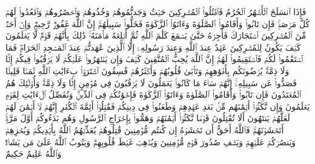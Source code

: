 \startbuffer[\q:9:5]
فَإِذَا ٱنسَلَخَ ٱلۡأَشۡهُرُ ٱلۡحُرُمُ فَٱقۡتُلُوا۟ ٱلۡمُشۡرِكِینَ حَیۡثُ وَجَدتُّمُوهُمۡ وَخُذُوهُمۡ وَٱحۡصُرُوهُمۡ وَٱقۡعُدُوا۟ لَهُمۡ كُلَّ مَرۡصَدࣲۚ فَإِن تَابُوا۟ وَأَقَامُوا۟ ٱلصَّلَوٰةَ وَءَاتَوُا۟ ٱلزَّكَوٰةَ فَخَلُّوا۟ سَبِیلَهُمۡۚ إِنَّ ٱللَّهَ غَفُورࣱ رَّحِیمࣱ%
\stopbuffer
\startbuffer[\q:9:6]
وَإِنۡ أَحَدࣱ مِّنَ ٱلۡمُشۡرِكِینَ ٱسۡتَجَارَكَ فَأَجِرۡهُ حَتَّىٰ یَسۡمَعَ كَلَٰمَ ٱللَّهِ ثُمَّ أَبۡلِغۡهُ مَأۡمَنَهُۥۚ ذَٰلِكَ بِأَنَّهُمۡ قَوۡمࣱ لَّا یَعۡلَمُونَ%
\stopbuffer
\startbuffer[\q:9:7]
كَیۡفَ یَكُونُ لِلۡمُشۡرِكِینَ عَهۡدٌ عِندَ ٱللَّهِ وَعِندَ رَسُولِهِۦۤ إِلَّا ٱلَّذِینَ عَٰهَدتُّمۡ عِندَ ٱلۡمَسۡجِدِ ٱلۡحَرَامِۖ فَمَا ٱسۡتَقَٰمُوا۟ لَكُمۡ فَٱسۡتَقِیمُوا۟ لَهُمۡۚ إِنَّ ٱللَّهَ یُحِبُّ ٱلۡمُتَّقِینَ%
\stopbuffer
\startbuffer[\q:9:8]
كَیۡفَ وَإِن یَظۡهَرُوا۟ عَلَیۡكُمۡ لَا یَرۡقُبُوا۟ فِیكُمۡ إِلࣰّا وَلَا ذِمَّةࣰۚ یُرۡضُونَكُم بِأَفۡوَٰهِهِمۡ وَتَأۡبَىٰ قُلُوبُهُمۡ وَأَكۡثَرُهُمۡ فَٰسِقُونَ%
\stopbuffer
\startbuffer[\q:9:9]
ٱشۡتَرَوۡا۟ بِءَایَٰتِ ٱللَّهِ ثَمَنࣰا قَلِیلࣰا فَصَدُّوا۟ عَن سَبِیلِهِۦۤۚ إِنَّهُمۡ سَاۤءَ مَا كَانُوا۟ یَعۡمَلُونَ%
\stopbuffer
\startbuffer[\q:9:10]
لَا یَرۡقُبُونَ فِی مُؤۡمِنٍ إِلࣰّا وَلَا ذِمَّةࣰۚ وَأُو۟لَٰۤئِكَ هُمُ ٱلۡمُعۡتَدُونَ%
\stopbuffer
\startbuffer[\q:9:11]
فَإِن تَابُوا۟ وَأَقَامُوا۟ ٱلصَّلَوٰةَ وَءَاتَوُا۟ ٱلزَّكَوٰةَ فَإِخۡوَٰنُكُمۡ فِی ٱلدِّینِۗ وَنُفَصِّلُ ٱلۡءَایَٰتِ لِقَوۡمࣲ یَعۡلَمُونَ%
\stopbuffer
\startbuffer[\q:9:12]
وَإِن نَّكَثُوۤا۟ أَیۡمَٰنَهُم مِّنۢ بَعۡدِ عَهۡدِهِمۡ وَطَعَنُوا۟ فِی دِینِكُمۡ فَقَٰتِلُوۤا۟ أَئِمَّةَ ٱلۡكُفۡرِ إِنَّهُمۡ لَاۤ أَیۡمَٰنَ لَهُمۡ لَعَلَّهُمۡ یَنتَهُونَ%
\stopbuffer
\startbuffer[\q:9:13]
أَلَا تُقَٰتِلُونَ قَوۡمࣰا نَّكَثُوۤا۟ أَیۡمَٰنَهُمۡ وَهَمُّوا۟ بِإِخۡرَاجِ ٱلرَّسُولِ وَهُم بَدَءُوكُمۡ أَوَّلَ مَرَّةٍۚ أَتَخۡشَوۡنَهُمۡۚ فَٱللَّهُ أَحَقُّ أَن تَخۡشَوۡهُ إِن كُنتُم مُّؤۡمِنِینَ%
\stopbuffer
\startbuffer[\q:9:14]
قَٰتِلُوهُمۡ یُعَذِّبۡهُمُ ٱللَّهُ بِأَیۡدِیكُمۡ وَیُخۡزِهِمۡ وَیَنصُرۡكُمۡ عَلَیۡهِمۡ وَیَشۡفِ صُدُورَ قَوۡمࣲ مُّؤۡمِنِینَ%
\stopbuffer
\startbuffer[\q:9:15]
وَیُذۡهِبۡ غَیۡظَ قُلُوبِهِمۡۗ وَیَتُوبُ ٱللَّهُ عَلَىٰ مَن یَشَاۤءُۗ وَٱللَّهُ عَلِیمٌ حَكِیمٌ%
\stopbuffer
